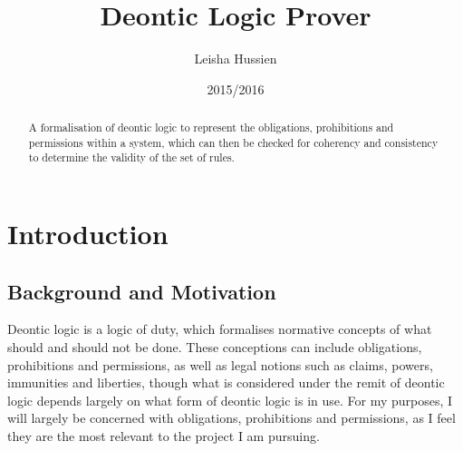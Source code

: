\documentclass{l4proj}
\begin{document}
\title{Deontic Logic Prover}
\author{Leisha Hussien}
\date{2015/2016}
\maketitle

\begin{abstract}
A formalisation of deontic logic to represent the obligations, prohibitions and permissions within a system, which can then be checked for coherency and consistency to determine the validity of the set of rules.
\end{abstract}

\educationalconsent

\tableofcontents













\chapter{Introduction}

\section{Background and Motivation}
Deontic logic is a logic of duty, which formalises normative concepts of what should and should not be done. These conceptions can include obligations, prohibitions and permissions, as well as legal notions such as claims, powers, immunities and liberties, though what is considered under the remit of deontic logic depends largely on what form of deontic logic is in use. For my purposes, I will largely be concerned with obligations, prohibitions and permissions, as I feel they are the most relevant to the project I am pursuing. 
\end{document}
